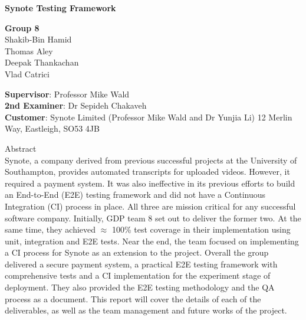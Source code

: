 \thispagestyle{plain}


\begin{center}
    
    {\selectfont

    \textbf{Synote Testing Framework}\\
        
    \vspace{1cm}
    
    \textbf{Group 8} \\
	Shakib-Bin Hamid \\ Thomas Aley \\ Deepak Thankachan \\ Vlad Catrici    
    
    \vspace{2cm}
	}    
\end{center}


{\selectfont
\textbf{Supervisor}: Professor Mike Wald\\
\textbf{2nd Examiner}: Dr Sepideh Chakaveh\\
\textbf{Customer}: Synote Limited (Professor Mike Wald and Dr Yunjia Li) 12 Merlin Way, Eastleigh, SO53 4JB
}

\vspace{1cm}

\begin{framed}

{\selectfont
Abstract\\

Synote, a company derived from previous successful projects at the University of Southampton, provides automated transcripts for uploaded videos. However, it required a payment system. It was also ineffective in its previous efforts to build an End-to-End (E2E) testing framework and did not have a Continuous Integration (CI) process in place. All three are mission critical for any successful software company. Initially, GDP team 8 set out to deliver the former two. At the same time, they achieved $\approx$ 100\% test coverage in their implementation using unit, integration and E2E tests. Near the end, the team focused on implementing a CI process for Synote as an extension to the project. Overall the group delivered a secure payment system, a practical E2E testing framework with comprehensive tests and a CI implementation for the experiment stage of deployment. They also provided the E2E testing methodology and the QA process as a document. This report will cover the details of each of the deliverables, as well as the team management and future works of the project.
}
\end{framed}

\restoregeometry

\large


